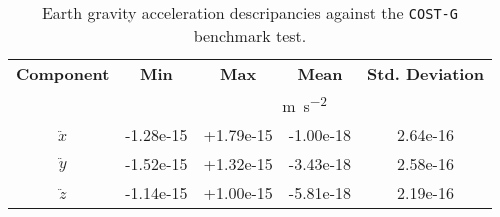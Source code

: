 \begin{table}[h!]
  \centering
  \begin{tabular}{ccccc}
      \textbf{Component} & \textbf{Min} & \textbf{Max} & \textbf{Mean} & \textbf{Std. Deviation}\\
      & \multicolumn{4}{c}{\si{\metre\per\square\second}} \\
      \hline
      $\ddot{x}$ & -1.28e-15 & +1.79e-15 & -1.00e-18 & 2.64e-16 \\
      $\ddot{y}$ & -1.52e-15 & +1.32e-15 & -3.43e-18 & 2.58e-16 \\
      $\ddot{z}$ & -1.14e-15 & +1.00e-15 & -5.81e-18 & 2.19e-16 \\
      \hline
  \end{tabular}
  \caption{Earth gravity acceleration descripancies against the \texttt{COST-G} benchmark test.}
  \label{table:costg-benchmark-02gravityfield-itrf}
\end{table}
